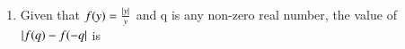 \documentclass[journal,12pt,onecolumn]{IEEEtran}
\theoremstyle{remark}
\begin{document}
\begin{enumerate}
\begin{enumerate}
\begin{multicols}{2}
			\end{multicols}
	\end{enumerate}
\item Given that $f(y) = \frac{\left\vert y\right\vert}{y}$ and q is any non-zero real number, the value of $\left\vert f(q) - f(-q\right\vert$ is
	\begin{enumerate}
	\end{enumerate}

			
\end{enumerate}
\end{document}
